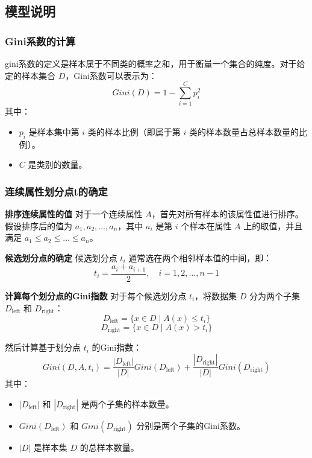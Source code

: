 \subsection{模型说明}
\subsubsection*{Gini系数的计算}
gini系数的定义是样本属于不同类的概率之和，用于衡量一个集合的纯度。对于给定的样本集合 \(D\)，Gini系数可以表示为：
\begin{equation}
	Gini(D) = 1 - \sum_{i=1}^{C} p_i^2
\end{equation}
其中：
\begin{itemize}
	\item \(p_i\) 是样本集中第 \(i\) 类的样本比例（即属于第 \(i\) 类的样本数量占总样本数量的比例）。
	\item \(C\) 是类别的数量。
\end{itemize}

\vspace*{1cm}



\subsubsection*{连续属性划分点t的确定}
\par
\textbf{排序连续属性的值}
对于一个连续属性 \(A\)，首先对所有样本的该属性值进行排序。假设排序后的值为 \(a_1, a_2, \dots, a_n\)，其中 \(a_i\) 是第 \(i\) 个样本在属性 \(A\) 上的取值，并且满足 \(a_1 \leq a_2 \leq \dots \leq a_n\)。

\textbf{候选划分点的确定}
候选划分点 \(t_i\) 通常选在两个相邻样本值的中间，即：
\begin{equation}
	t_i = \frac{a_i + a_{i+1}}{2}, \quad i = 1, 2, \dots, n-1
\end{equation}

\textbf{计算每个划分点的Gini指数}
对于每个候选划分点 \(t_i\)，将数据集 \(D\) 分为两个子集 \(D_{\text{left}}\) 和 \(D_{\text{right}}\)：
\begin{equation}
	D_{\text{left}} = \{x \in D \mid A(x) \leq t_i\}
\end{equation}
\begin{equation}
	D_{\text{right}} = \{x \in D \mid A(x) > t_i\}
\end{equation}

然后计算基于划分点 \(t_i\) 的Gini指数：
\begin{equation}
	Gini(D, A, t_i) = \frac{|D_{\text{left}}|}{|D|} Gini(D_{\text{left}}) + \frac{|D_{\text{right}}|}{|D|} Gini(D_{\text{right}})
\end{equation}
其中：
\begin{itemize}
	\item \(|D_{\text{left}}|\) 和 \(|D_{\text{right}}|\) 是两个子集的样本数量。
	\item \(Gini(D_{\text{left}})\) 和 \(Gini(D_{\text{right}})\) 分别是两个子集的Gini系数。
	\item \(|D|\) 是样本集 \(D\) 的总样本数量。
\end{itemize}

